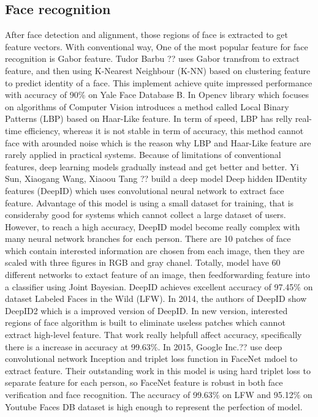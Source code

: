 \documentclass[journal, twocolumn]{IEEEtran}
\begin{document}
\subsection{Face recognition}
After face detection and alignment, those regions of face is extracted to get feature vectors. With conventional way, One of the most popular feature for face recognition is Gabor feature. Tudor Barbu ?? uses Gabor transfrom to extract feature, and then using K-Nearest Neighbour (K-NN) based on clustering feature to predict identity of a face. This implement achieve quite impressed performance with accuracy of 90\% on Yale Face Database B. In Opencv library which focuses on algorithms of Computer Vision introduces a method called Local Binary Patterns (LBP) based on Haar-Like feature. In term of speed, LBP has relly real-time efficiency, whereas it is not stable in term of accuracy, this method cannot face with arounded noise which is the reason why LBP and Haar-Like feature are rarely applied in practical systems. Because of limitations of conventional features,  deep learning models gradually instead and get better and better. Yi Sun, Xiaogang Wang, Xiaoou Tang ?? build a deep model Deep hidden IDentity features (DeepID) which uses convolutional neural network to extract face feature. Advantage of this model is using a small dataset for training, that is consideraby good for systems which cannot collect a large dataset of users. However, to reach a high accuracy, DeepID model become really complex with many neural network branches for each person. There are 10 patches of face which contain interested information are chosen from each image, then they are scaled with three figures in RGB and gray chanel. Totally, model have 60 different networks to extact feature of an image, then feedforwarding feature into a classifier using Joint Bayesian. DeepID achieves excellent accuracy of 97.45\% on dataset Labeled Faces in the
Wild (LFW). In 2014, the authors of DeepID show DeepID2 which is a improved version of DeepID. In new version, interested regions of face algorithm is built to eliminate useless patches which cannot extract high-level feature. That work really helpfull affect accuracy, specifically there is a increase in accuracy at 99.63\%. In 2015, Google Inc.?? use deep convolutional network Inception and triplet loss function in FaceNet mdoel to extract feature. Their outstanding work in this model is using hard triplet loss to separate feature for each person, so FaceNet feature is robust in both face verification and face recognition. The accuracy of 99.63\% on LFW and 95.12\% on Youtube Faces
DB dataset is high enough to represent the perfection of model.
\medskip
\end{document}

